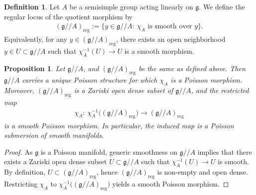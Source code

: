 \documentclass[11pt]{amsart}
\newtheorem{proposition}[theorem]{Proposition}
\theoremstyle{definition}
\newtheorem{definition}[theorem]{Definition}
\theoremstyle{plain}
\newtheorem{remark}[theorem]{Remark}
\theoremstyle{conclusion}
\begin{document}
\begin{definition} 
\label{def:regularstr} \cite[Chapter 1, \S 5]{HartshorneAG}
Let $A$ be a semisimple group acting linearly on $\mathfrak{g}$.  We define the regular locus of the quotient morphism by \begin{align*}
    (\mathfrak{g}//A)_{\mathrm{reg}} := \{ y\in \mathfrak{g}//A : \ \chi_A \text{ is smooth over } y  \}.
\end{align*} Equivalently, for any $y\in (\mathfrak{g}//A)_{\mathrm{reg}}$,  there exists an open neighborhood $y\in U\subset \mathfrak{g}//A$ such that $\chi_A^{-1}(U)\to U$ is a smooth morphism.
\end{definition}

\begin{proposition} 
\label{prop:smoothregularg} \cite[Proposition 1.26]{Brion2010Actions}
Let $\mathfrak{g}//A$, and $(\mathfrak{g}//A)_{\mathrm{reg}}$ be the same as defined above. Then $\mathfrak{g}//A$ carries a unique Poisson structure for which $\chi_A$ is a Poisson morphism. Moreover, $(\mathfrak{g}//A)_{\mathrm{reg}}$ is a Zariski open dense subset of $\mathfrak{g}//A$, and the restricted map \begin{align*}
    \chi_A:\ \chi_A^{-1}\big((\mathfrak{g}//A)_{\mathrm{reg}}\big)   \longrightarrow (\mathfrak{g}//A)_{\mathrm{reg}}
\end{align*}  is a smooth Poisson morphism. In particular, the induced map is a Poisson submersion of smooth manifolds.
\end{proposition}

\begin{proof}
As $\mathfrak{g}$ is a Poisson manifold, generic smoothness on $\mathfrak{g}//A$ implies that there exists a Zariski open dense subset $U\subset \mathfrak{g}//A$ such that $\chi_A^{-1}(U)\to U$ is smooth. By definition, $U\subset (\mathfrak{g}//A)_{\mathrm{reg}}$, hence $(\mathfrak{g}//A)_{\mathrm{reg}}$ is non-empty and open dense. Restricting $\chi_A$ to $\chi_A^{-1}\big((\mathfrak{g}//A)_{\mathrm{reg}}\big)$ yields a smooth Poisson morphism. 
\end{proof}

    
\end{document}
